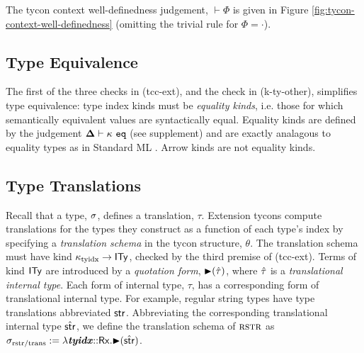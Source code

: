 \documentclass[pldi]{sigplanconf-pldi15}
\begin{document}
\noindent The tycon context well-definedness judgement, $\vdash \Phi$ is given in Figure \ref{fig:tycon-context-well-definedness} (omitting the trivial rule for $\Phi=\cdot$). 



\subsection{Type Equivalence}\label{sec:type-equivalence}
\noindent The first of the three checks in (tcc-ext), and the check in (k-ty-other),  simplifies type equivalence: type index kinds must be \emph{equality kinds}, i.e. those for which semantically equivalent values are syntactically equal. Equality kinds are defined by the judgement $\boldsymbol\Delta \vdash \kappa~\mathtt{eq}$ (see supplement) and are exactly analagous to equality types as in Standard ML \cite{Tofte:89:TheDefinitionOfStandardML}. Arrow kinds are not equality kinds.

\subsection{Type Translations}\label{sec:type-translations}

\noindent 
Recall that a type, $\sigma$, defines a translation, $\tau$. Extension tycons {compute} translations for the types they construct as a function of each type's index by specifying a \emph{translation schema} in the {tycon structure}, $\theta$. The translation schema must have kind $\kappa_\text{tyidx} \rightarrow {\sf ITy}$, checked by the third premise of (tcc-ext). Terms of kind ${\sf ITy}$ are introduced by a \emph{quotation form}, ${\blacktriangleright}(\hat{\tau})$, where $\hat{\tau}$ is a \emph{translational internal type}. Each form of internal type, $\tau$,  has a corresponding form of translational internal type. For example, regular string types have type translations abbreviated ${\sf str}$. Abbreviating the corresponding translational internal type $\hat{{\sf str}}$, we define the translation schema of $\textsc{rstr}$ as $\sigma_\text{rstr/trans} := \lambda {\textbf{\textit{tyidx}}}{::}{\sf Rx}.{\blacktriangleright}(\hat{{\sf str}})$. 


\end{document}
